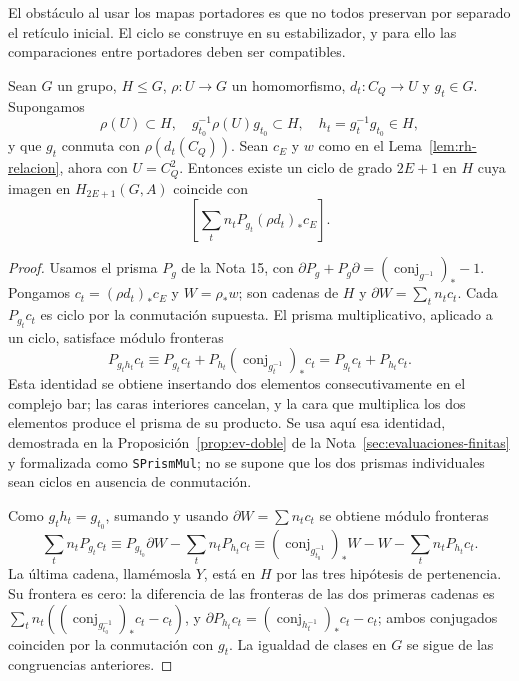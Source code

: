 El obstáculo al usar los mapas portadores es que no todos preservan por separado el retículo inicial. El ciclo se construye en su estabilizador, y para ello las comparaciones entre portadores deben ser compatibles.

\begin{proposicion}
\label{prop:rh-prismas}
Sean $G$ un grupo, $H\le G$, $\rho:U\to G$ un homomorfismo, $d_t:C_Q\to U$ y $g_t\in G$. Supongamos
\[
 \rho(U)\subset H,\quad g_{t_0}^{-1}\rho(U)g_{t_0}\subset H,
 \quad h_t=g_t^{-1}g_{t_0}\in H,
\]
 y que $g_t$ conmuta con $\rho(d_t(C_Q))$. Sean $c_E$ y $w$ como en el Lema~\ref{lem:rh-relacion}, ahora con $U=C_Q^2$. Entonces existe un ciclo de grado $2E+1$ en $H$ cuya imagen en $H_{2E+1}(G,A)$ coincide con
\begin{equation}
 \left[\sum_t n_t P_{g_t}(\rho d_t)_*c_E\right].
 \label{eq:rh-prismas}
\end{equation}
\end{proposicion}
\begin{proof}
Usamos el prisma $P_g$ de la Nota 15, con $\partial P_g+P_g\partial=(\operatorname{conj}_{g^{-1}})_*-1$. Pongamos $c_t=(\rho d_t)_*c_E$ y $W=\rho_*w$; son cadenas de $H$ y $\partial W=\sum_t n_tc_t$. Cada $P_{g_t}c_t$ es ciclo por la conmutación supuesta. El prisma multiplicativo, aplicado a un ciclo, satisface módulo fronteras
\[
 P_{g_t h_t}c_t\equiv P_{g_t}c_t+P_{h_t}(\operatorname{conj}_{g_t^{-1}})_*c_t
 =P_{g_t}c_t+P_{h_t}c_t.
\]
Esta identidad se obtiene insertando dos elementos consecutivamente en el complejo bar; las caras interiores cancelan, y la cara que multiplica los dos elementos produce el prisma de su producto. Se usa aquí esa identidad, demostrada en la Proposición~\ref{prop:ev-doble} de la Nota~\ref{sec:evaluaciones-finitas} y formalizada como \texttt{SPrismMul}; no se supone que los dos prismas individuales sean ciclos en ausencia de conmutación.

Como $g_th_t=g_{t_0}$, sumando y usando $\partial W=\sum n_tc_t$ se obtiene módulo fronteras
\[
 \sum_t n_tP_{g_t}c_t\equiv
 P_{g_{t_0}}\partial W-\sum_t n_tP_{h_t}c_t
 \equiv (\operatorname{conj}_{g_{t_0}^{-1}})_*W-W-\sum_t n_tP_{h_t}c_t.
\]
La última cadena, llamémosla $Y$, está en $H$ por las tres hipótesis de pertenencia. Su frontera es cero: la diferencia de las fronteras de las dos primeras cadenas es $\sum_t n_t((\operatorname{conj}_{g_{t_0}^{-1}})_*c_t-c_t)$, y $\partial P_{h_t}c_t=(\operatorname{conj}_{h_t^{-1}})_*c_t-c_t$; ambos conjugados coinciden por la conmutación con $g_t$. La igualdad de clases en $G$ se sigue de las congruencias anteriores.
\end{proof}

